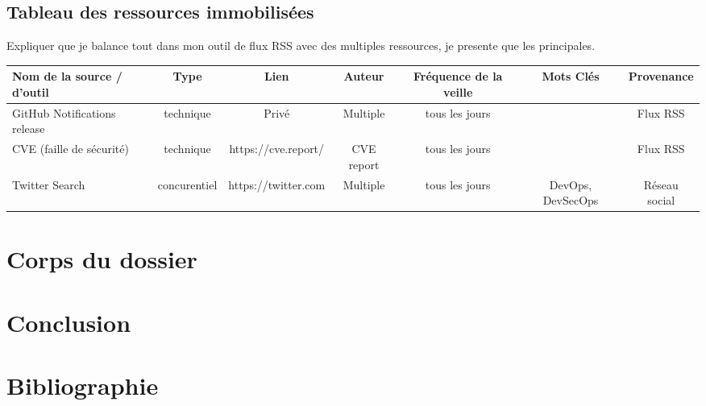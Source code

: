 \documentclass[11pt,a4paper,oneside]{book}
\begin{document}
\begin{landscape}

\section{Tableau des ressources immobilisées}

Expliquer que je balance tout dans mon outil de flux RSS avec des multiples ressources, je presente que les principales.

\begin{tabular}{|l|c|c|c|c|c|c|}
\hline
\rowcolor{gray!30} Nom de la source / d'outil & Type & Lien & Auteur & Fréquence de la veille & Mots Clés & Provenance \\
\hline
GitHub Notifications release & technique & Privé & Multiple & tous les jours & & Flux RSS \\
CVE (faille de sécurité) & technique & https://cve.report/ & CVE report & tous les jours & & Flux RSS \\
Twitter Search & concurentiel & https://twitter.com & Multiple & tous les jours & DevOps, DevSecOps & Réseau social \\
\hline
\end{tabular}

\end{landscape}

\chapter{Corps du dossier}

\chapter{Conclusion}


\chapter{Bibliographie}
\end{document}
